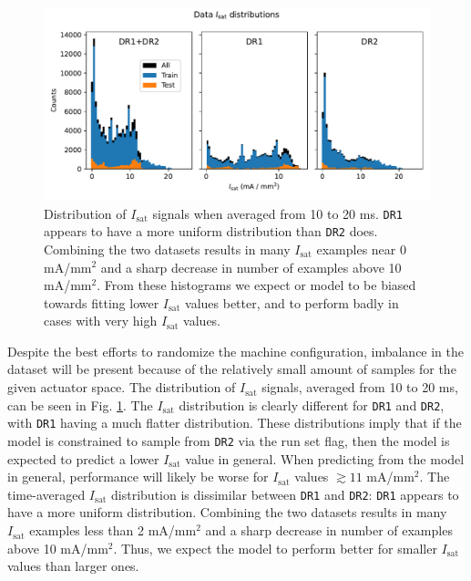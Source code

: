 \begin{figure}
	\centering
	\includegraphics[width=\linewidth]{figures/PP1_02_isat_distribution.pdf}
	\caption[Time-averaged $I_\text{sat}$ distribution over shots]{\label{fig:PP1_02_isat_distribution}Distribution of $I_\text{sat}$ signals when averaged from 10 to 20 ms. \texttt{DR1} appears to have a more uniform distribution than \texttt{DR2} does. Combining the two datasets results in many $I_\text{sat}$ examples near 0 mA/mm$^2$ and a sharp decrease in number of examples above 10 mA/mm$^2$. From these histograms we expect or model to be biased towards fitting lower $I_\text{sat}$ values better, and to perform badly in cases with very high $I_\text{sat}$ values.}
\end{figure}

Despite the best efforts to randomize the machine configuration, imbalance in the dataset will be present because of the relatively small amount of samples for the given actuator space. The distribution of $I_\text{sat}$ signals, averaged from 10 to 20 ms, can be seen in Fig. \ref{fig:PP1_02_isat_distribution}. The $I_\text{sat}$ distribution is clearly different for \texttt{DR1} and \texttt{DR2}, with \texttt{DR1} having a much flatter distribution. These distributions imply that if the model is constrained to sample from \texttt{DR2} via the run set flag, then the model is expected to predict a lower $I_\text{sat}$ value in general. When predicting from the model in general, performance will likely be worse for $I_\text{sat}$ values $\gtrsim 11$ mA/mm$^2$. The time-averaged $I_\text{sat}$ distribution is dissimilar between \texttt{DR1} and \texttt{DR2}: \texttt{DR1} appears to have a more uniform distribution. Combining the two datasets results in many $I_\text{sat}$ examples less than 2 mA/mm$^2$ and a sharp decrease in number of examples above 10 mA/mm$^2$. Thus, we expect the model to perform better for smaller $I_\text{sat}$ values than larger ones. 

